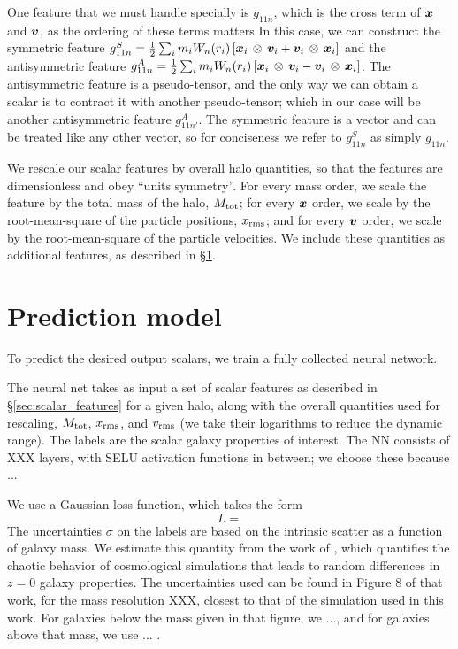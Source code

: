 One feature that we must handle specially is $g_{11n}$, which is the cross term of $\bm{x}$ and $\bm{v}$, as the ordering of these terms matters
In this case, we can construct the symmetric feature $g^S_{11n} = \frac{1}{2} \sum_i m_i W_n(r_i) \left[ \bm{x}_i \, \otimes \, \bm{v}_i + \bm{v}_i \, \otimes \, \bm{x}_i \right]$ and the antisymmetric feature $g^A_{11n} = \frac{1}{2} \sum_i m_i W_n(r_i) \left[ \bm{x}_i \, \otimes \, \bm{v}_i - \bm{v}_i \, \otimes \, \bm{x}_i \right]$.
The antisymmetric feature is a pseudo-tensor, and the only way we can obtain a scalar is to contract it with another pseudo-tensor; which in our case will be another antisymmetric feature $g^A_{11n'}$.
The symmetric feature is a vector and can be treated like any other vector, so for conciseness we refer to $g^S_{11n}$ as simply $g_{11n}$.

We rescale our scalar features by overall halo quantities, so that the features are dimensionless and obey ``units symmetry''.
For every mass order, we scale the feature by the total mass of the halo, $M_\mathrm{tot}$; for every $\bm{x}$ order, we scale by the root-mean-square of the particle positions, $x_\mathrm{rms}$; and for every $\bm{v}$ order, we scale by the root-mean-square of the particle velocities.
We include these quantities as additional features, as described in \S\ref{sec:regression}.


\section{Prediction model}
\label{sec:regression}

To predict the desired output scalars, we train a fully collected neural network.


The neural net takes as input a set of scalar features as described in \S\ref{sec:scalar_features} for a given halo, along with the overall quantities used for rescaling, $M_\mathrm{tot}$, $x_\mathrm{rms}$, and $v_\mathrm{rms}$ (we take their logarithms to reduce the dynamic range).
The labels are the scalar galaxy properties of interest.
The NN consists of XXX layers, with SELU activation functions in between; we choose these because ... 

We use a Gaussian loss function, which takes the form
\begin{equation}
    L = 
\end{equation}
The uncertainties $\sigma$ on the labels are based on the intrinsic scatter as a function of galaxy mass.
We estimate this quantity from the work of \cite{Genel2019}, which quantifies the chaotic behavior of cosmological simulations that leads to random differences in $z=0$ galaxy properties.
The uncertainties used can be found in Figure 8 of that work, for the mass resolution XXX, closest to that of the simulation used in this work.
For galaxies below the mass given in that figure, we ..., and for galaxies above that mass, we use ... .


